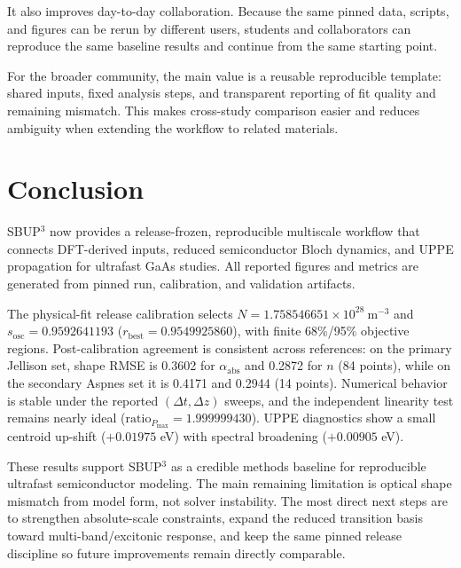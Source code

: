 \documentclass[aps,pra,twocolumn,reprint,superscriptaddress,nofootinbib]{revtex4-2}
\begin{document}
It also improves day-to-day collaboration. Because the same pinned data, scripts,
and figures can be rerun by different users, students and collaborators can
reproduce the same baseline results and continue from the same starting point.

For the broader community, the main value is a reusable reproducible template:
shared inputs, fixed analysis steps, and transparent reporting of fit quality
and remaining mismatch. This makes cross-study comparison easier and reduces
ambiguity when extending the workflow to related materials.

\section{Conclusion}
SBUP$^3$ now provides a release-frozen, reproducible multiscale workflow that
connects DFT-derived inputs, reduced semiconductor Bloch dynamics, and UPPE
propagation for ultrafast GaAs studies. All reported figures and metrics are
generated from pinned run, calibration, and validation artifacts.

The physical-fit release calibration selects
$N=1.758546651\times10^{28}~\mathrm{m^{-3}}$ and
$s_{\mathrm{osc}}=0.9592641193$
($r_{\mathrm{best}}=0.9549925860$), with finite 68\%/95\% objective regions.
Post-calibration agreement is consistent across references: on the primary
Jellison set, shape RMSE is 0.3602 for $\alpha_{\mathrm{abs}}$ and 0.2872 for
$n$ (84 points), while on the secondary Aspnes set it is 0.4171 and 0.2944
(14 points). Numerical behavior is stable under the reported
$(\Delta t,\Delta z)$ sweeps, and the independent linearity test remains nearly
ideal
($\mathrm{ratio}_{P_{\max}}=1.999999430$). UPPE diagnostics show a small
centroid up-shift ($+0.01975$ eV) with spectral broadening ($+0.00905$ eV).

These results support SBUP$^3$ as a credible methods baseline for reproducible
ultrafast semiconductor modeling. The main remaining limitation is optical
shape mismatch from model form, not solver instability. The most direct next
steps are to strengthen absolute-scale constraints, expand the reduced
transition basis toward multi-band/excitonic response, and keep the same pinned
release discipline so future improvements remain directly comparable.
\end{document}
